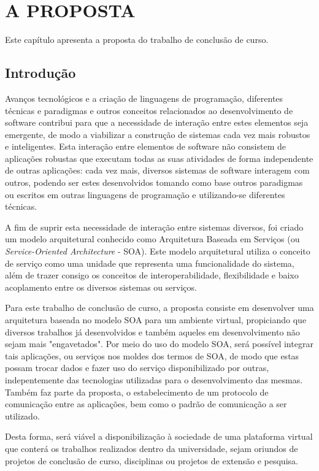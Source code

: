 \chapter[A PROPOSTA]{A PROPOSTA}

Este capítulo apresenta a proposta do trabalho de conclusão de curso.

\section{Introdução}
Avanços tecnológicos e a criação de linguagens de programação, diferentes técnicas e paradigmas e outros conceitos relacionados ao desenvolvimento de software contribui para que a necessidade de interação entre estes elementos seja emergente, de modo a viabilizar a construção de sistemas cada vez mais robustos e inteligentes. Esta interação entre elementos de software não consistem de aplicações robustas que executam todas as suas atividades de forma independente de outras aplicações: cada vez mais, diversos sistemas de software interagem com outros, podendo ser estes desenvolvidos tomando como base outros paradigmas ou escritos em outras linguagens de programação e utilizando-se diferentes técnicas.

A fim de suprir esta necessidade de interação entre sistemas diversos, foi criado um modelo arquitetural conhecido como Arquitetura Baseada em Serviços (ou \textit{Service-Oriented Architecture} - SOA). Este modelo arquitetural utiliza o conceito de serviço como uma unidade que representa uma funcionalidade do sistema, além de trazer consigo os conceitos de interoperabilidade, flexibilidade e baixo acoplamento entre os diversos sistemas ou serviços.

Para este trabalho de conclusão de curso, a proposta consiste em desenvolver uma arquitetura baseada no modelo SOA para um ambiente virtual, propiciando que diversos trabalhos já desenvolvidos e também aqueles em desenvolvimento não sejam mais "engavetados". Por meio do uso do modelo SOA, será possível integrar tais aplicações, ou serviços nos moldes dos termos de SOA, de modo que estas possam trocar dados e fazer uso do serviço disponibilizado por outras, indepentemente das tecnologias utilizadas para o desenvolvimento das mesmas. Também faz parte da proposta, o estabelecimento de um protocolo de comunicação entre as aplicações, bem como o padrão de comunicação a ser utilizado.

Desta forma, será viável a disponibilização à sociedade de uma plataforma virtual que conterá os trabalhos realizados dentro da universidade, sejam oriundos de projetos de conclusão de curso, disciplinas ou projetos de extensão e pesquisa.

